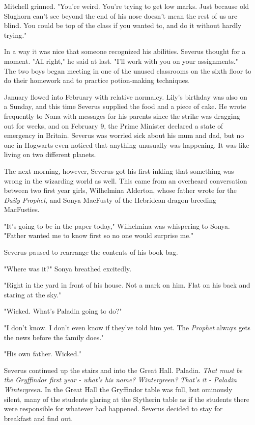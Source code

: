 \documentclass[a4paper,11pt]{article}
\begin{document}
Mitchell grinned. "You're weird. You're trying to get low marks. Just because old Slughorn can't see beyond the end of his nose doesn't mean the rest of us are blind. You could be top of the class if you wanted to, and do it without hardly trying."

In a way it was nice that someone recognized his abilities. Severus thought for a moment. "All right," he said at last. "I'll work with you on your assignments." The two boys began meeting in one of the unused classrooms on the sixth floor to do their homework and to practice potion-making techniques.

January flowed into February with relative normalcy. Lily's birthday was also on a Sunday, and this time Severus supplied the food and a piece of cake. He wrote frequently to Nana with messages for his parents since the strike was dragging out for weeks, and on February 9, the Prime Minister declared a state of emergency in Britain. Severus was worried sick about his mum and dad, but no one in Hogwarts even noticed that anything unusually was happening. It was like living on two different planets.

The next morning, however, Severus got his first inkling that something was wrong in the wizarding world as well. This came from an overheard conversation between two first year girls, Wilhelmina Alderton, whose father wrote for the \emph{Daily Prophet}, and Sonya MacFusty of the Hebridean dragon-breeding MacFusties.

"It's going to be in the paper today," Wilhelmina was whispering to Sonya. "Father wanted me to know first so no one would surprise me."

Severus paused to rearrange the contents of his book bag.

"Where was it?" Sonya breathed excitedly.

"Right in the yard in front of his house. Not a mark on him. Flat on his back and staring at the sky."

"Wicked. What's Paladin going to do?"

"I don't know. I don't even know if they've told him yet. The \emph{Prophet} always gets the news before the family does."

"His own father. Wicked."

Severus continued up the stairs and into the Great Hall. Paladin. \emph{That must be the Gryffindor first year - what's his name? Wintergreen? That's it - Paladin Wintergreen.} In the Great Hall the Gryffindor table was full, but ominously silent, many of the students glaring at the Slytherin table as if the students there were responsible for whatever had happened. Severus decided to stay for breakfast and find out.
\end{document}
